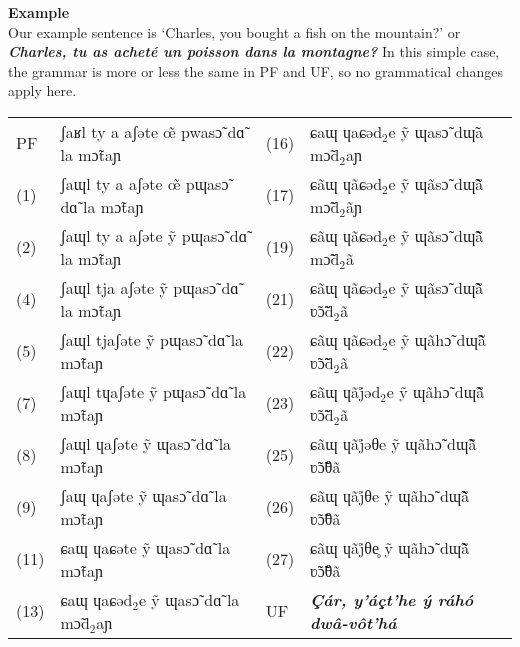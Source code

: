 \documentclass[a4paper, 12pt, oneside, final]{article}
\def\parheading#1{\noindent\textbf{#1}}
\begin{document}

\parheading{Example}\\
Our example sentence is ‘Charles, you bought a fish on the mountain?’ or \textbf{\textit{Charles, tu as acheté un pois\-son dans la montagne?}}
In this simple case, the grammar is more or less the same in PF and UF, so no grammatical changes apply here.\par\medskip

\noindent\begin{tabular}{@{}llll}
PF& ʃaʁl ty a aʃəte œ̃ pwasɔ̃ dɑ̃ la mɔ̃taɲ &(16)& ɕaɰ ɥaɕəd$_2$e ỹ ɰasɔ̃ dɰ̃a mɔ̃d$_2$aɲ \\
(1)&ʃaɰl ty a aʃəte œ̃ pɰasɔ̃ dɑ̃ la mɔ̃taɲ &(17)&ɕãɰ ɥãɕəd$_2$e ỹ ɰãsɔ̃ dɰ̃ã̃ mɔ̃̃d$_2$ãɲ \\
(2)&ʃaɰl ty a aʃəte ỹ pɰasɔ̃ dɑ̃ la mɔ̃taɲ &(19)&ɕãɰ ɥãɕəd$_2$e ỹ ɰãsɔ̃ dɰ̃ã̃ mɔ̃̃d$_2$ã \\
(4)&ʃaɰl tja aʃəte ỹ pɰasɔ̃ dɑ̃ la mɔ̃taɲ &(21)&ɕãɰ ɥãɕəd$_2$e ỹ ɰãsɔ̃ dɰ̃ã̃ ʋ̃ɔ̃̃d$_2$ã \\
(5)&ʃaɰl tjaʃəte ỹ pɰasɔ̃ dɑ̃ la mɔ̃taɲ &(22)&ɕãɰ ɥãɕəd$_2$e ỹ ɰãhɔ̃ dɰ̃ã̃ ʋ̃ɔ̃̃d$_2$ã \\
(7)&ʃaɰl tɥaʃəte ỹ pɰasɔ̃ dɑ̃ la mɔ̃taɲ &(23)&ɕãɰ ɥãj̊əd$_2$e ỹ ɰãhɔ̃ dɰ̃ã̃ ʋ̃ɔ̃̃d$_2$ã \\
(8)&ʃaɰl ɥaʃəte ỹ ɰasɔ̃ dɑ̃ la mɔ̃taɲ &(25)&ɕãɰ ɥãj̊əθe ỹ ɰãhɔ̃ dɰ̃ã̃ ʋ̃ɔ̃̃θã \\
(9)&ʃaɰ ɥaʃəte ỹ ɰasɔ̃ dɑ̃ la mɔ̃taɲ &(26)&ɕãɰ ɥãj̊θe ỹ ɰãhɔ̃ dɰ̃ã̃ ʋ̃ɔ̃̃θã \\
(11)&ɕaɰ ɥaɕəte ỹ ɰasɔ̃ dɑ̃ la mɔ̃taɲ &(27)&ɕãɰ ɥãj̊θe̥ ỹ ɰãhɔ̃ dɰ̃ã̃ ʋ̃ɔ̃̃θã \\
(13)&ɕaɰ ɥaɕəd$_2$e ỹ ɰasɔ̃ dɑ̃ la mɔ̃d$_2$aɲ &UF&\bfseries\itshape Çár, y’áçt’he ý ráhó dwâ-vôt’há \\
\end{tabular}
\end{document}
